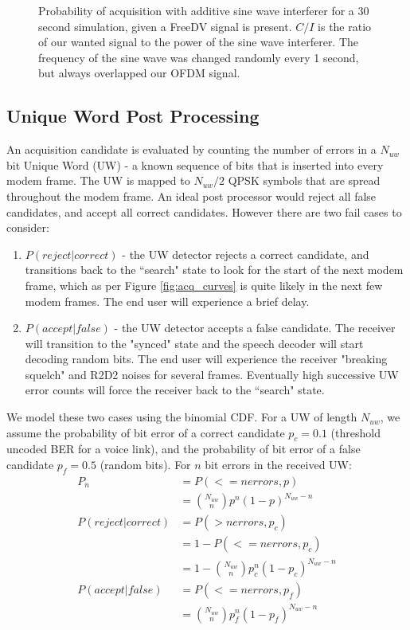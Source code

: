 \documentclass{article}
\begin{document}
\begin{figure}[H]
\caption{Probability of acquisition with additive sine wave interferer for a 30 second simulation, given a FreeDV signal is present. $C/I$ is the ratio of our wanted signal to the power of the sine wave interferer.  The frequency of the sine wave was changed randomly every 1 second, but always overlapped our OFDM signal.}
\label{fig:acq_curves_sin}
\begin{center}

\end{center}
\end{figure}

\subsection{Unique Word Post Processing}
\label{sec:uw}

An acquisition candidate is evaluated by counting the number of errors in a $N_{uw}$ bit Unique Word (UW) - a known sequence of bits that is inserted into every modem frame.  The UW is mapped to $N_{uw}/2$ QPSK symbols that are spread throughout the modem frame.  An ideal post processor would reject all false candidates, and accept all correct candidates.  However there are two fail cases to consider:
\begin{enumerate}
\item $P(reject|correct)$ - the UW detector rejects a correct candidate, and transitions back to the ``search" state to look for the start of the next modem frame, which as per Figure \ref{fig:acq_curves} is quite likely in the next few modem frames.  The end user will experience a brief delay.
\item $P(accept|false)$ - the UW detector accepts a false candidate.  The receiver will transition to the "synced" state and the speech decoder will start decoding random bits.  The end user will experience the receiver "breaking squelch" and R2D2 noises for several frames. Eventually high successive UW error counts will force the receiver back to the ``search" state.
\end{enumerate}
We model these two cases using the binomial CDF.  For a UW of length $N_{uw}$, we assume the probability of bit error of a correct candidate $p_c=0.1$ (threshold uncoded BER for a voice link), and the probability of bit error of a false candidate $p_f=0.5$ (random bits).  For $n$ bit errors in the received UW:
\begin{equation}
\begin{split}
P_n &= P(<=n errors, p) \\
    &= {N_{uw} \choose n} p^n (1-p)^{N_{uw}-n} \\
P(reject|correct) &= P(> n errors, p_c) \\
                  &= 1 - P(<=n errors, p_c) \\
                  &= 1 - {N_{uw} \choose n} p_c^n (1-p_c)^{N_{uw}-n} \\
P(accept|false)   &= P(<= n errors, p_f) \\
                  &= {N_{uw} \choose n} p_f^n (1-p_f)^{N_{uw}-n}
\end{split}
\end{equation}
\end{document}
